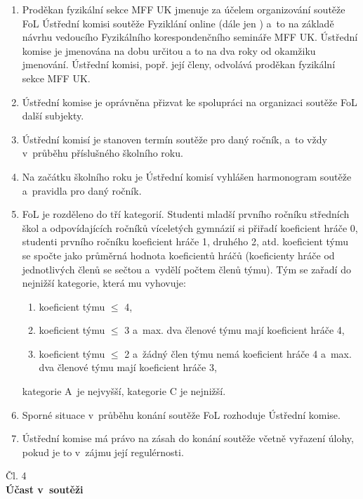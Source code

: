 \documentclass[a4paper,11pt,oneside]{article}
\begin{document}
\begin{enumerate}[(1)]
\item Proděkan fyzikální sekce MFF UK jmenuje za účelem organizování soutěže FoL Ústřední komisi soutěže Fyziklání online (dále jen ) a~to na základě návrhu vedoucího Fyzikálního korespondenčního semináře MFF UK. Ústřední komise je jmenována na dobu určitou a to na dva roky od okamžiku jmenování. Ústřední komisi, popř. její členy, odvolává proděkan fyzikální sekce MFF UK.

\item Ústřední komise je oprávněna přizvat ke spolupráci na organizaci soutěže FoL další subjekty.

\item Ústřední komisí je stanoven termín soutěže pro daný ročník, a~to vždy v~průběhu příslušného školního roku.

\item Na začátku školního roku je Ústřední komisí vyhlášen harmonogram soutěže a~pravidla pro daný ročník.

\item FoL je rozděleno do tří kategorií. Studenti mladší prvního ročníku  středních škol a odpovídajících ročníků víceletých gymnázií si přiřadí koeficient hráče 0, studenti prvního ročníku koeficient hráče 1, druhého 2, atd. koeficient týmu se spočte jako průměrná hodnota koeficientů hráčů (koeficienty hráče od jednotlivých členů se sečtou a~vydělí počtem členů týmu). Tým se zařadí do nejnižší kategorie, která mu vyhovuje: 
\begin{enumerate}[({kategorie} A)]
\item koeficient týmu $\leq$ 4,
\item koeficient týmu $\leq$ 3 a~max. dva členové týmu mají koeficient hráče 4,
\item koeficient týmu $\leq$ 2 a~žádný člen týmu nemá koeficient hráče 4 a~max. dva členové týmu mají koeficient hráče 3,
\end{enumerate}
kategorie A~je nejvyšší, kategorie C je nejnižší.

\item Sporné situace v~průběhu konání soutěže FoL rozhoduje Ústřední komise.

\item Ústřední komise má právo na zásah do konání soutěže včetně vyřazení úlohy, pokud je to v~zájmu její regulérnosti.
\end{enumerate}

\begin{center}
{\Large{Čl. 4}}\\
\large{\bf{Účast v~soutěži}}
\end{center}
\end{document}
